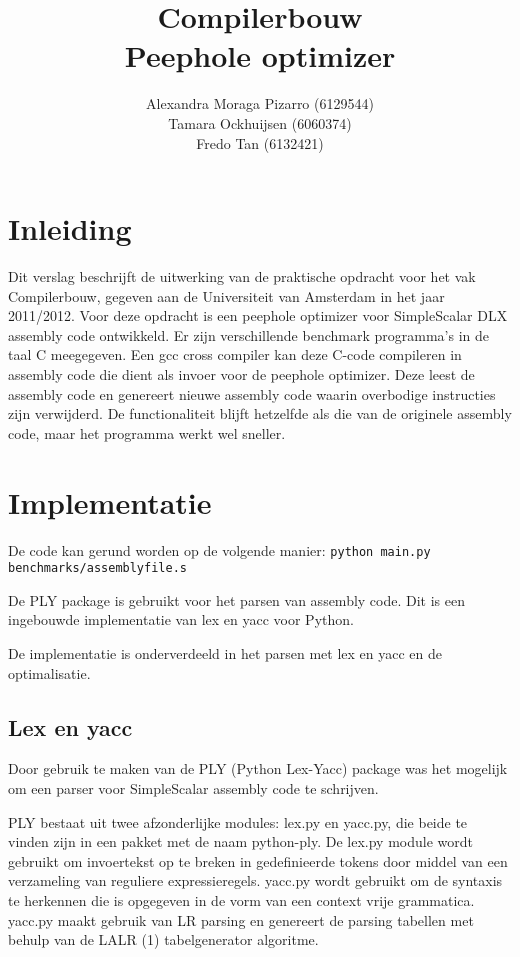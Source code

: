 \documentclass[11pt]{article}
\author{Alexandra Moraga Pizarro (6129544)
      \\Tamara Ockhuijsen (6060374)
      \\Fredo Tan (6132421)}
\title{Compilerbouw
     \\Peephole optimizer}
\begin{document}
\maketitle
\newpage

\section{Inleiding}
Dit verslag beschrijft de uitwerking van de praktische opdracht voor het vak 
Compilerbouw, gegeven aan de Universiteit van Amsterdam in het jaar 2011/2012. 
Voor deze opdracht is een peephole optimizer voor SimpleScalar DLX assembly 
code ontwikkeld. Er zijn verschillende benchmark programma's in de taal C 
meegegeven. Een gcc cross compiler kan deze C-code compileren in assembly code 
die dient als invoer voor de peephole optimizer. Deze leest de assembly code 
en genereert nieuwe assembly code waarin overbodige instructies zijn 
verwijderd. De functionaliteit blijft hetzelfde als die van de originele 
assembly code, maar het programma werkt wel sneller.

\section{Implementatie}
De code kan gerund worden op de volgende manier: 
\verb'python main.py benchmarks/assemblyfile.s'

De PLY package is gebruikt voor het parsen van assembly code. Dit is een 
ingebouwde implementatie van lex en yacc voor Python.

De implementatie is onderverdeeld in het parsen met lex en yacc en de 
optimalisatie.
\subsection{Lex en yacc}
Door gebruik te maken van de PLY (Python Lex-Yacc) package was het mogelijk om 
een parser voor SimpleScalar assembly code te schrijven.

PLY bestaat uit twee afzonderlijke modules: lex.py en yacc.py, die beide te 
vinden zijn in een pakket met de naam python-ply. De lex.py module wordt 
gebruikt om invoertekst op te breken in gedefinieerde tokens door middel
van een verzameling van reguliere expressieregels. yacc.py wordt gebruikt om de 
syntaxis te herkennen die is opgegeven in de vorm van een context vrije 
grammatica. yacc.py maakt gebruik van LR parsing en genereert de parsing 
tabellen met behulp van de LALR (1) tabelgenerator algoritme.
\end{document}
